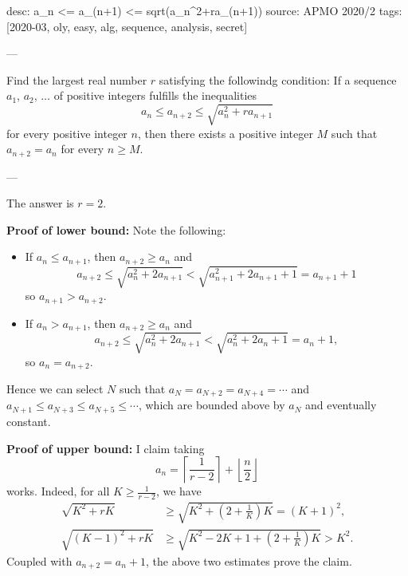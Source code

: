 desc: a_n <= a_(n+1) <= sqrt(a_n^2+ra_(n+1))
source: APMO 2020/2
tags: [2020-03, oly, easy, alg, sequence, analysis, secret]

---

Find the largest real number $r$ satisfying the followindg condition: If a sequence $a_1$, $a_2$, $\ldots$ of positive integers fulfills the inequalities \[a_n\le a_{n+2}\le\sqrt{a_n^2+ra_{n+1}}\]
for every positive integer $n$, then there exists a positive integer $M$ such that $a_{n+2}=a_n$ for every $n\ge M$.

---

The answer is $r=2$.

\bigskip

\noindent\textbf{Proof of lower bound:} Note the following:
\begin{itemize}
    \item If $a_n\le a_{n+1}$, then $a_{n+2}\ge a_n$ and \[a_{n+2}\le\sqrt{a_n^2+2a_{n+1}}<\sqrt{a_{n+1}^2+2a_{n+1}+1}=a_{n+1}+1\]
        so $a_{n+1}>a_{n+2}$.
    \item If $a_n>a_{n+1}$, then $a_{n+2}\ge a_n$ and \[a_{n+2}\le\sqrt{a_n^2+2a_{n+1}}<\sqrt{a_n^2+2a_n+1}=a_n+1,\]
        so $a_n=a_{n+2}$.
\end{itemize}
Hence we can select $N$ such that $a_N=a_{N+2}=a_{N+4}=\cdots$ and $a_{N+1}\le a_{N+3}\le a_{N+5}\le\cdots$, which are bounded above by $a_N$ and eventually constant.

\bigskip

\noindent\textbf{Proof of upper bound:} I claim taking \[a_n=\left\lceil\frac1{r-2}\right\rceil+\left\lfloor\frac n2\right\rfloor\]
works. Indeed, for all $K\ge\tfrac1{r-2}$, we have
\begin{align*}
    \sqrt{K^2+rK}&\ge\sqrt{K^2+\left(2+\frac1K\right)K}=(K+1)^2,\\
    \sqrt{(K-1)^2+rK}&\ge\sqrt{K^2-2K+1+\left(2+\frac1K\right)K}>K^2.
\end{align*}
Coupled with $a_{n+2}=a_n+1$, the above two estimates prove the claim.
